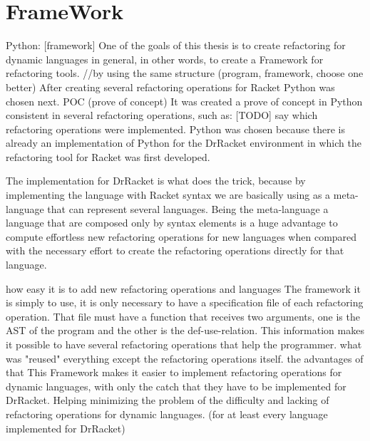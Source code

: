 \section{FrameWork}
Python: [framework]
One of the goals of this thesis is to create refactoring for dynamic languages in general,
in other words, to create a Framework for refactoring tools.
//by using the same structure (program, framework, choose one better)
After creating several refactoring operations for Racket Python was chosen next.
POC (prove of concept)
It was created a prove of concept in Python consistent in several refactoring operations, such as:
[TODO] say which refactoring operations were implemented.
Python was chosen because there is already an implementation of Python for the
 DrRacket environment in which the refactoring tool for Racket was first developed.


 The implementation for DrRacket is what does the trick, because by implementing
 the language with Racket syntax we are basically using as a meta-language that
 can represent several languages. Being the meta-language a language that are
 composed only by syntax elements is a huge advantage to compute effortless new
 refactoring operations for new languages when compared with the necessary effort to create
 the refactoring operations directly for that language.



how easy it is to add new refactoring operations and languages
The framework it is simply to use, it is only necessary to have a specification file
of each refactoring operation.
That file must have a function that receives two arguments,
one is the AST of the program and the other is the def-use-relation.
This information makes it possible to have several refactoring operations that help
the programmer.
what was "reused"
everything except the refactoring operations itself.
the advantages of that
This Framework makes it easier to implement refactoring operations for dynamic languages,
with only the catch that they have to be implemented for DrRacket. Helping minimizing
the problem of the difficulty and lacking of refactoring operations for dynamic languages.
(for at least every language implemented for DrRacket)
